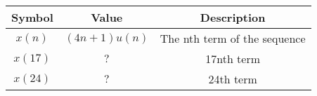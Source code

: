 
    \begin{tabular}{|c|c|c|}
    \hline
     \textbf{Symbol} & \textbf{Value} &
     \textbf{Description}\\
    \hline
     $x(n)$ &  $(4n+1)u(n)$ & The nth term of the sequence\\[6pt]
    \hline 
     $x(17)$ &  $?$ & 17nth term \\[6pt]
    \hline
     $x(24)$ &  $?$ & 24th term\\[6pt]
    \hline
     
\end{tabular}
